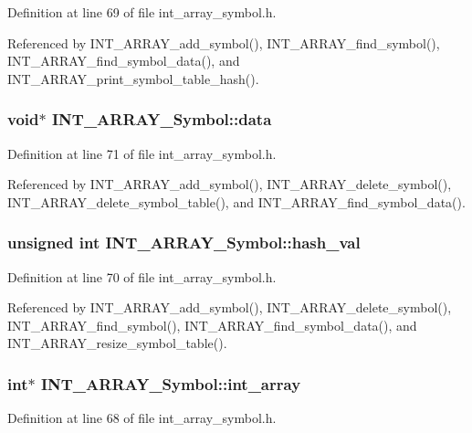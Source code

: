 Definition at line 69 of file int\_\-array\_\-symbol.h.

Referenced by INT\_\-ARRAY\_\-add\_\-symbol(), INT\_\-ARRAY\_\-find\_\-symbol(), INT\_\-ARRAY\_\-find\_\-symbol\_\-data(), and INT\_\-ARRAY\_\-print\_\-symbol\_\-table\_\-hash().
\subsubsection{\setlength{\rightskip}{0pt plus 5cm}void$\ast$ \bf{INT\_\-ARRAY\_\-Symbol::data}}\label{structINT__ARRAY__Symbol_6e5609aef1c1b64e91acd11d64f02e87}




Definition at line 71 of file int\_\-array\_\-symbol.h.

Referenced by INT\_\-ARRAY\_\-add\_\-symbol(), INT\_\-ARRAY\_\-delete\_\-symbol(), INT\_\-ARRAY\_\-delete\_\-symbol\_\-table(), and INT\_\-ARRAY\_\-find\_\-symbol\_\-data().
\subsubsection{\setlength{\rightskip}{0pt plus 5cm}unsigned int \bf{INT\_\-ARRAY\_\-Symbol::hash\_\-val}}\label{structINT__ARRAY__Symbol_f7b32a9ba504f0d515af0bb227be67f2}




Definition at line 70 of file int\_\-array\_\-symbol.h.

Referenced by INT\_\-ARRAY\_\-add\_\-symbol(), INT\_\-ARRAY\_\-delete\_\-symbol(), INT\_\-ARRAY\_\-find\_\-symbol(), INT\_\-ARRAY\_\-find\_\-symbol\_\-data(), and INT\_\-ARRAY\_\-resize\_\-symbol\_\-table().
\subsubsection{\setlength{\rightskip}{0pt plus 5cm}int$\ast$ \bf{INT\_\-ARRAY\_\-Symbol::int\_\-array}}\label{structINT__ARRAY__Symbol_9295da9e9ba542d44a1ca374ea18e733}




Definition at line 68 of file int\_\-array\_\-symbol.h.

